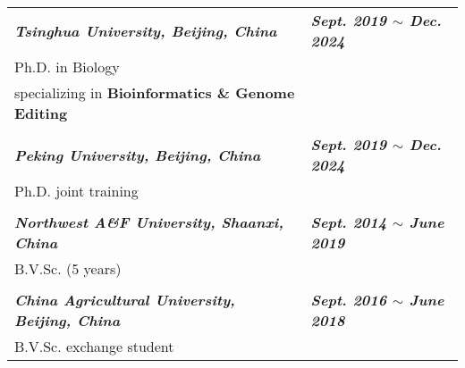 

\renewcommand{\thefootnote}{\fnsymbol{footnote}}
\setcounter{footnote}{0}
\begin{longtable}{p{} p{}}
    \textit{\textbf{Tsinghua University, Beijing, China}} & \textit{\textbf{Sept. 2019 $\sim$ Dec. 2024\footnotemark[1]}} \\
    Ph.D. in Biology &  \\
    specializing in \textbf{Bioinformatics \& Genome Editing} & \\
    & \\
    \textit{\textbf{Peking University, Beijing, China}} & \textit{\textbf{Sept. 2019 $\sim$ Dec. 2024\footnotemark[1]}} \\
    Ph.D. joint training &  \\
    & \\
    \textit{\textbf{Northwest A\&F University, Shaanxi, China}} & \textit{\textbf{Sept. 2014 $\sim$ June 2019}} \\
    B.V.Sc. (5 years) & \\
    & \\
    \textit{\textbf{China Agricultural University, Beijing, China}} & \textit{\textbf{Sept. 2016 $\sim$ June 2018}} \\
    B.V.Sc. exchange student &  \\
\end{longtable}


\renewcommand{\thefootnote}{\arabic{footnote}}
\setcounter{footnote}{1}
